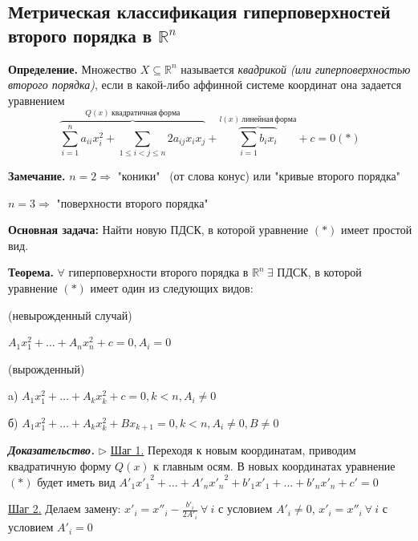 \subsection{Метрическая классификация гиперповерхностей второго порядка в $\mathbb{R}^n$}

\textbf{Определение.} Множество $X \subseteq \mathbb{R}^n$ называется \textit{квадрикой (или гиперповерхностью второго порядка)}, если в какой-либо аффинной системе координат она задается уравнением \[\overbrace{\sum\limits_{i=1}^n a_{ii} x_i^2 + \sum\limits_{1 \leqslant i < j \leqslant n} 2 a_{ij} x_i x_j}^{Q(x) \ квадратичная \ форма} + \overbrace{\sum\limits_{i=1} b_i x_i}^{l(x) \ линейная \ форма} + c = 0 (*)\]

\vspace{\baselineskip}
\textbf{Замечание.} $n = 2 \Rightarrow$ "коники" \ (от слова конус) или "кривые второго порядка"

$n = 3 \Rightarrow$ "поверхности второго порядка"

\vspace{\baselineskip}
\textbf{Основная задача:} Найти новую ПДСК, в которой уравнение $(*)$ имеет простой вид.

\vspace{\baselineskip}
\textbf{Теорема.} $\forall$ гиперповерхности второго порядка в $\mathbb{R}^n \ \exists$ ПДСК, в которой уравнение $(*)$ имеет один из следующих видов:

\vspace{\baselineskip}
 (невырожденный случай)

$A_1 x_1^2 + \dots + A_n x_n^2 + c = 0, A_i = 0$

\vspace{\baselineskip}
 (вырожденный)

a) $A_1 x_1^2 + \dots + A_k x_k^2 + c = 0, k < n, A_i \neq 0$

б) $A_1 x_1^2 + \dots + A_k x_k^2 + B x_{k+1} = 0, k < n, A_i \neq 0, B \neq 0$

\vspace{\baselineskip}
\textbf{\textit{Доказательство.}} $\rhd$ \underline{Шаг 1.} Переходя к новым координатам, приводим квадратичную форму $Q(x)$ к главным осям. В новых координатах уравнение $(*)$ будет иметь вид $A'_1 {x'_1}^2 + \dots + A'_n {x'_n}^2 + b'_1 x'_1 + \dots + b'_n x'_n + c' = 0$

\underline{Шаг 2.} Делаем замену: $x'_i = x''_i - \frac{b'_i}{2A'_i} \ \forall \ i$ с условием $A'_i \neq 0$, $x'_i = x''_i \ \forall \ i$ с условием $A'_i = 0$

